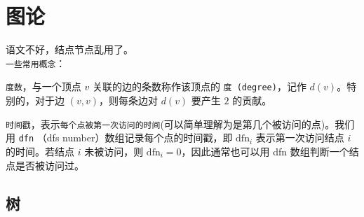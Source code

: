 \documentclass[10pt,twoside,a4paper,UTF8]{ctexbook}
\begin{document}
	
	\part{图论}
	语文不好，结点节点乱用了。\\
	\texttt{一些常用概念}：\par
	\texttt{度数}，与一个顶点 $v$ 关联的边的条数称作该顶点的 \texttt{度 (degree)}，记作 $d(v)$。特别的，对于边 $(v,v)$，则每条边对 $d(v)$ 要产生 $2$ 的贡献。\par
	\texttt{时间戳}，表示\texttt{每个点被第一次访问的时间}(可以简单理解为是第几个被访问的点)。我们用 \texttt{dfn} （dfs number）数组记录每个点的时间戳，即 $\text{dfn}_i$ 表示第一次访问结点 $i$ 的时间。若结点 $i$ 未被访问，则 $\text{dfn}_i = 0$，因此通常也可以用 dfn 数组判断一个结点是否被访问过。
	\chapter{树}
\end{document}
